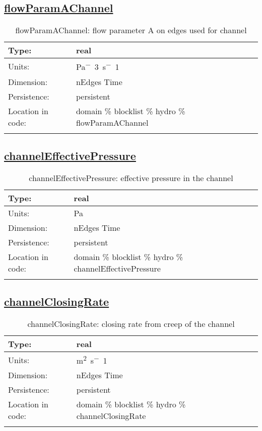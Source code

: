 \subsection[flowParamAChannel]{\hyperref[sec:var_tab_hydro]{flowParamAChannel}}
\label{subsec:var_sec_hydro_flowParamAChannel}
\begin{center}
\begin{longtable}{| p{2.0in} | p{4.0in} |}
        \hline 
        Type: & real \\
        \hline 
        Units: & \si{Pa^-3.s^-1} \\
        \hline 
        Dimension: & nEdges Time \\
        \hline 
        Persistence: & persistent \\
        \hline 
         Location in code: & domain \% blocklist \% hydro \% flowParamAChannel \\
         \hline 
    \caption{flowParamAChannel: flow parameter A on edges used for channel}
\end{longtable}
\end{center}
\subsection[channelEffectivePressure]{\hyperref[sec:var_tab_hydro]{channelEffectivePressure}}
\label{subsec:var_sec_hydro_channelEffectivePressure}
\begin{center}
\begin{longtable}{| p{2.0in} | p{4.0in} |}
        \hline 
        Type: & real \\
        \hline 
        Units: & \si{Pa} \\
        \hline 
        Dimension: & nEdges Time \\
        \hline 
        Persistence: & persistent \\
        \hline 
         Location in code: & domain \% blocklist \% hydro \% channelEffectivePressure \\
         \hline 
    \caption{channelEffectivePressure: effective pressure in the channel}
\end{longtable}
\end{center}
\subsection[channelClosingRate]{\hyperref[sec:var_tab_hydro]{channelClosingRate}}
\label{subsec:var_sec_hydro_channelClosingRate}
\begin{center}
\begin{longtable}{| p{2.0in} | p{4.0in} |}
        \hline 
        Type: & real \\
        \hline 
        Units: & \si{m^2.s^-1} \\
        \hline 
        Dimension: & nEdges Time \\
        \hline 
        Persistence: & persistent \\
        \hline 
         Location in code: & domain \% blocklist \% hydro \% channelClosingRate \\
         \hline 
    \caption{channelClosingRate: closing rate from creep of the channel}
\end{longtable}
\end{center}
